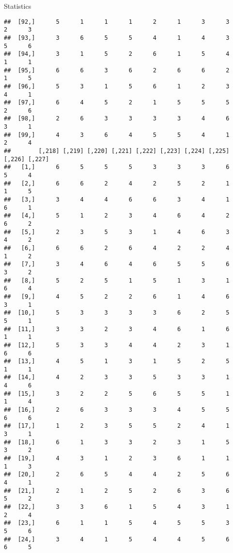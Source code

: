 \documentclass[
  ignorenonframetext,
]{beamer}
\begin{document}
\begin{frame}[fragile]{Statistics}
\begin{verbatim}
##  [92,]      5      1      1      1      2      1      3      3      2      3
##  [93,]      3      6      5      5      4      1      4      3      5      6
##  [94,]      3      1      5      2      6      1      5      4      1      1
##  [95,]      6      6      3      6      2      6      6      2      1      5
##  [96,]      5      3      1      5      6      1      2      3      4      1
##  [97,]      6      4      5      2      1      5      5      5      2      6
##  [98,]      2      6      3      3      3      3      4      6      3      1
##  [99,]      4      3      6      4      5      5      4      1      2      4
##        [,218] [,219] [,220] [,221] [,222] [,223] [,224] [,225] [,226] [,227]
##   [1,]      6      5      5      5      3      3      3      6      5      4
##   [2,]      6      6      2      4      2      5      2      1      1      5
##   [3,]      3      4      4      6      6      3      4      1      6      1
##   [4,]      5      1      2      3      4      6      4      2      6      2
##   [5,]      2      3      5      3      1      4      6      3      4      2
##   [6,]      6      6      2      6      4      2      2      4      1      2
##   [7,]      3      4      6      4      6      5      5      6      3      2
##   [8,]      5      2      5      1      5      1      3      1      6      4
##   [9,]      4      5      2      2      6      1      4      6      3      1
##  [10,]      5      3      3      3      3      6      2      5      5      1
##  [11,]      3      3      2      3      4      6      1      6      1      1
##  [12,]      5      3      3      4      4      2      3      1      6      6
##  [13,]      4      5      1      3      1      5      2      5      1      1
##  [14,]      4      2      3      3      5      3      3      1      4      6
##  [15,]      3      2      2      5      6      5      5      1      1      4
##  [16,]      2      6      3      3      3      4      5      5      6      6
##  [17,]      1      2      3      5      5      2      4      1      3      1
##  [18,]      6      1      3      3      2      3      1      5      3      2
##  [19,]      4      3      1      2      3      6      1      1      1      3
##  [20,]      2      6      5      4      4      2      5      6      4      1
##  [21,]      2      1      2      5      2      6      3      6      5      2
##  [22,]      3      3      6      1      5      4      3      1      2      4
##  [23,]      6      1      1      5      4      5      5      3      5      6
##  [24,]      3      4      1      5      4      4      5      6      6      5

\end{verbatim}
\end{frame}
\end{document}
